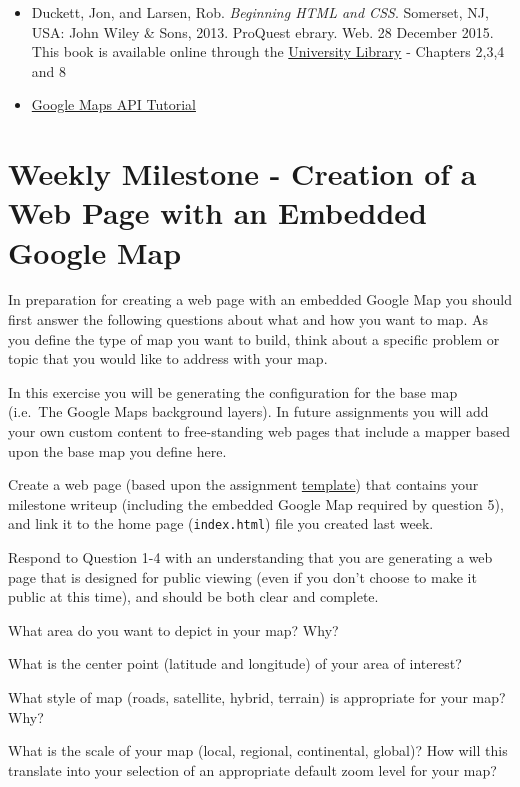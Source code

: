 \documentclass[]{book}
\providecommand{\tightlist}{%
  \setlength{\itemsep}{0pt}\setlength{\parskip}{0pt}}
\begin{document}
\begin{itemize}
\item
  Duckett, Jon, and Larsen, Rob. \emph{Beginning HTML and CSS}.
  Somerset, NJ, USA: John Wiley \& Sons, 2013. ProQuest ebrary. Web. 28
  December 2015. This book is available online through the
  \href{http://site.ebrary.com.libproxy.unm.edu/lib/unma/detail.action?docID=10667426}{University
  Library} - Chapters 2,3,4 and 8
\item
  \href{http://code.google.com/apis/maps/documentation/javascript/tutorial.html}{Google
  Maps API Tutorial}
\end{itemize}

\section{Weekly Milestone - Creation of a Web Page with an Embedded
Google Map}\label{week03-milestone}

In preparation for creating a web page with an embedded Google Map you
should first answer the following questions about what and how you want
to map. As you define the type of map you want to build, think about a
specific problem or topic that you would like to address with your map.

In this exercise you will be generating the configuration for the base
map (i.e.~The Google Maps background layers). In future assignments you
will add your own custom content to free-standing web pages that include
a mapper based upon the base map you define here.

Create a web page (based upon the assignment
\href{https://github.com/UNM-GEOG-485-585/class-materials/blob/master/sample-files/assignmentTemplate.html}{template})
that contains your milestone writeup (including the embedded Google Map
required by question 5), and link it to the home page
(\texttt{index.html}) file you created last week.

Respond to Question 1-4 with an understanding that you are generating a
web page that is designed for public viewing (even if you don't choose
to make it public at this time), and should be both clear and complete.

\begin{description}
\tightlist
\item[Question 1]
What area do you want to depict in your map? Why?
\item[Question 2]
What is the center point (latitude and longitude) of your area of
interest?
\item[Question 3]
What style of map (roads, satellite, hybrid, terrain) is appropriate for
your map? Why?
\item[Question 4]
What is the scale of your map (local, regional, continental, global)?
How will this translate into your selection of an appropriate default
zoom level for your map?
\end{description}
\end{document}
